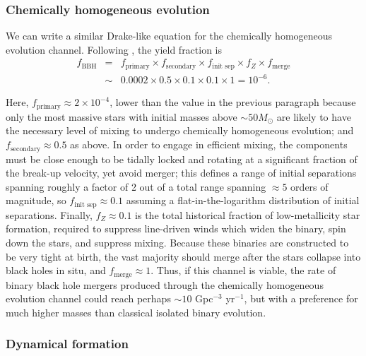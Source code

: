 \documentclass[review]{elsarticle}
\begin{document}
\subsubsection{Chemically homogeneous evolution}

We can write a similar Drake-like equation for the chemically homogeneous evolution channel.  Following \citet{MandeldeMink:2016},  the yield fraction is
\begin{eqnarray}
f_\textrm{BBH} &=& f_\textrm{primary} \times f_\textrm{secondary} \times f_\textrm{init sep} \times f_Z \times f_\textrm{merge} \nonumber \\
 & \sim & 0.0002 \times 0.5 \times 0.1 \times 0.1 \times 1 = 10^{-6}.
\end{eqnarray}

Here, $f_\textrm{primary} \approx 2 \times 10^{-4}$, lower than the value in the previous paragraph because only the most massive stars with initial masses above $\sim 50 M_\odot$ are likely to have the necessary level of mixing to undergo chemically homogeneous evolution; and $f_\textrm{secondary} \approx 0.5$ as above.  In order to engage in efficient mixing, the components must be close enough to be tidally locked and rotating at a significant fraction of the break-up velocity, yet avoid merger; this defines a range of initial separations spanning roughly a factor of 2 out of a total range spanning $\approx 5$ orders of magnitude, so $f_\textrm{init sep} \approx 0.1$ assuming a flat-in-the-logarithm distribution of initial separations.  Finally, $f_Z \approx 0.1$ is the total historical fraction of low-metallicity star formation, required to suppress line-driven winds which widen the binary, spin down the stars, and suppress mixing.  Because these binaries are constructed to be very tight at birth, the vast majority should merge after the stars collapse into black holes in situ, and $f_\textrm{merge} \approx 1$. Thus, if this channel is viable, the rate of binary black hole mergers produced through the chemically homogeneous evolution channel could reach perhaps $\sim 10$ Gpc$^{-3}$ yr$^{-1}$, but with a preference for much higher masses than classical isolated binary evolution.


\subsubsection{Dynamical formation}
\end{document}
